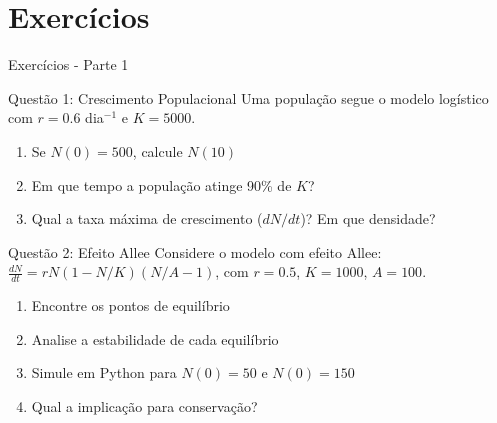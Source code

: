 \section{Exercícios}

\begin{frame}{Exercícios - Parte 1}
\begin{block}{Questão 1: Crescimento Populacional}
Uma população segue o modelo logístico com $r = 0.6$ dia$^{-1}$ e $K = 5000$.
\begin{enumerate}
    \item Se $N(0) = 500$, calcule $N(10)$
    \item Em que tempo a população atinge 90\% de $K$?
    \item Qual a taxa máxima de crescimento ($dN/dt$)? Em que densidade?
\end{enumerate}
\end{block}

\begin{block}{Questão 2: Efeito Allee}
Considere o modelo com efeito Allee: $\frac{dN}{dt} = rN(1 - N/K)(N/A - 1)$, com $r = 0.5$, $K = 1000$, $A = 100$.
\begin{enumerate}
    \item Encontre os pontos de equilíbrio
    \item Analise a estabilidade de cada equilíbrio
    \item Simule em Python para $N(0) = 50$ e $N(0) = 150$
    \item Qual a implicação para conservação?
\end{enumerate}
\end{block}
\end{frame}

